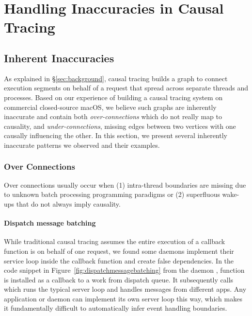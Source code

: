 \section{Handling Inaccuracies in Causal Tracing}\label{sec:inaccuracy}

\subsection{Inherent Inaccuracies}


As explained in \S\ref{sec:background}, causal tracing builds a graph to connect
execution segments on behalf of a request that spread across separate threads
and processes. Based on our experience of building a causal tracing system on
commercial closed-source macOS, we believe such graphs are inherently inaccurate
and contain both \emph{over-connections} which do not really map to
causality, and \emph{under-connections}, missing edges between two vertices
with one causally influencing the other. In this section, we present several
inherently inaccurate patterns we observed and their examples.

\subsubsection{Over Connections} \label{subsec:overconnections}

Over connections usually occur when (1) intra-thread boundaries are missing due
to unknown batch processing programming paradigms or (2) superfluous wake-ups
that do not always imply causality.

\paragraph{Dispatch message batching}

While traditional causal tracing assumes the entire execution of a callback
function is on behalf of one request, we found some daemons implement their
service loop inside the callback function and create false dependencies. In the
code snippet in Figure~\ref{fig:dispatchmessagebatching} from the 
daemon , function  is installed as a callback to
a work from dispatch queue. It subsequently calls 
which runs the typical server loop and handles messages from different apps. Any
application or daemon can implement its own server loop this way, which makes it
fundamentally difficult to automatically infer event handling boundaries.

